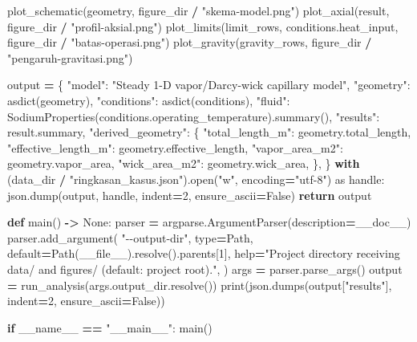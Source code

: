 \documentclass[
  12pt,a4paper,oneside]{report}
\newenvironment{Shaded}{\begin{snugshade}}{\end{snugshade}}
\newcommand{\BuiltInTok}[1]{#1}
\newcommand{\ControlFlowTok}[1]{\textcolor[rgb]{0.13,0.29,0.53}{\textbf{#1}}}
\newcommand{\DecValTok}[1]{\textcolor[rgb]{0.00,0.00,0.81}{#1}}
\newcommand{\ImportTok}[1]{#1}
\newcommand{\KeywordTok}[1]{\textcolor[rgb]{0.13,0.29,0.53}{\textbf{#1}}}
\newcommand{\NormalTok}[1]{#1}
\newcommand{\OperatorTok}[1]{\textcolor[rgb]{0.81,0.36,0.00}{\textbf{#1}}}
\newcommand{\StringTok}[1]{\textcolor[rgb]{0.31,0.60,0.02}{#1}}
\newcommand{\VariableTok}[1]{\textcolor[rgb]{0.00,0.00,0.00}{#1}}
\begin{document}
\begin{Shaded}
\begin{Highlighting}[]
\NormalTok{    plot\_schematic(geometry, figure\_dir }\OperatorTok{/} \StringTok{"skema{-}model.png"}\NormalTok{)}
\NormalTok{    plot\_axial(result, figure\_dir }\OperatorTok{/} \StringTok{"profil{-}aksial.png"}\NormalTok{)}
\NormalTok{    plot\_limits(limit\_rows, conditions.heat\_input, figure\_dir }\OperatorTok{/} \StringTok{"batas{-}operasi.png"}\NormalTok{)}
\NormalTok{    plot\_gravity(gravity\_rows, figure\_dir }\OperatorTok{/} \StringTok{"pengaruh{-}gravitasi.png"}\NormalTok{)}

\NormalTok{    output }\OperatorTok{=}\NormalTok{ \{}
        \StringTok{"model"}\NormalTok{: }\StringTok{"Steady 1{-}D vapor/Darcy{-}wick capillary model"}\NormalTok{,}
        \StringTok{"geometry"}\NormalTok{: asdict(geometry),}
        \StringTok{"conditions"}\NormalTok{: asdict(conditions),}
        \StringTok{"fluid"}\NormalTok{: SodiumProperties(conditions.operating\_temperature).summary(),}
        \StringTok{"results"}\NormalTok{: result.summary,}
        \StringTok{"derived\_geometry"}\NormalTok{: \{}
            \StringTok{"total\_length\_m"}\NormalTok{: geometry.total\_length,}
            \StringTok{"effective\_length\_m"}\NormalTok{: geometry.effective\_length,}
            \StringTok{"vapor\_area\_m2"}\NormalTok{: geometry.vapor\_area,}
            \StringTok{"wick\_area\_m2"}\NormalTok{: geometry.wick\_area,}
\NormalTok{        \},}
\NormalTok{    \}}
    \ControlFlowTok{with}\NormalTok{ (data\_dir }\OperatorTok{/} \StringTok{"ringkasan\_kasus.json"}\NormalTok{).}\BuiltInTok{open}\NormalTok{(}\StringTok{"w"}\NormalTok{, encoding}\OperatorTok{=}\StringTok{"utf{-}8"}\NormalTok{) }\ImportTok{as}\NormalTok{ handle:}
\NormalTok{        json.dump(output, handle, indent}\OperatorTok{=}\DecValTok{2}\NormalTok{, ensure\_ascii}\OperatorTok{=}\VariableTok{False}\NormalTok{)}
    \ControlFlowTok{return}\NormalTok{ output}


\KeywordTok{def}\NormalTok{ main() }\OperatorTok{{-}\textgreater{}} \VariableTok{None}\NormalTok{:}
\NormalTok{    parser }\OperatorTok{=}\NormalTok{ argparse.ArgumentParser(description}\OperatorTok{=}\NormalTok{\_\_doc\_\_)}
\NormalTok{    parser.add\_argument(}
        \StringTok{"{-}{-}output{-}dir"}\NormalTok{, }\BuiltInTok{type}\OperatorTok{=}\NormalTok{Path, default}\OperatorTok{=}\NormalTok{Path(}\VariableTok{\_\_file\_\_}\NormalTok{).resolve().parents[}\DecValTok{1}\NormalTok{],}
        \BuiltInTok{help}\OperatorTok{=}\StringTok{"Project directory receiving data/ and figures/ (default: project root)."}\NormalTok{,}
\NormalTok{    )}
\NormalTok{    args }\OperatorTok{=}\NormalTok{ parser.parse\_args()}
\NormalTok{    output }\OperatorTok{=}\NormalTok{ run\_analysis(args.output\_dir.resolve())}
    \BuiltInTok{print}\NormalTok{(json.dumps(output[}\StringTok{"results"}\NormalTok{], indent}\OperatorTok{=}\DecValTok{2}\NormalTok{, ensure\_ascii}\OperatorTok{=}\VariableTok{False}\NormalTok{))}


\ControlFlowTok{if} \VariableTok{\_\_name\_\_} \OperatorTok{==} \StringTok{"\_\_main\_\_"}\NormalTok{:}
\NormalTok{    main()}
\end{Highlighting}
\end{Shaded}
\end{document}
